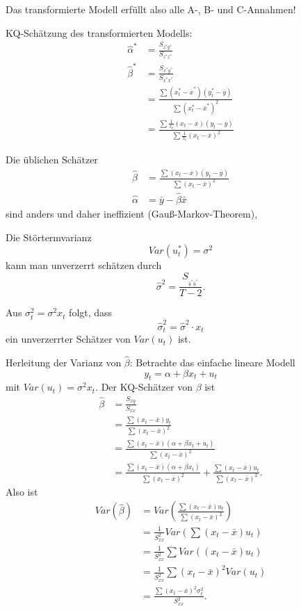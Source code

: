 \documentclass{article}
\begin{document}
Das transformierte Modell erfüllt also alle A-, B- und C-Annahmen!

KQ-Schätzung des transformierten Modells:
\begin{align*}
\hat\alpha^{\ast} &= \frac{S_{z^{\ast }y^{\ast }}}{S_{z^{\ast}z^{\ast }}} \\
\hat\beta^{\ast } &= \frac{S_{x^{\ast }y^{\ast }}}{S_{x^{\ast}x^{\ast }}} \\
&= \frac{\sum \left(x_t^{\ast }-\overline{x}^{\ast }\right) 
	\left(y_t^{\ast }-\overline{y}\right)}{\sum \left(x_t^{\ast }-\overline{x}^{\ast }\right)^2} \\
&= \frac{\sum \frac{1}{x_{t}}\left( x_{t}-\overline{x}\right) \left( y_{t}-\overline{y}\right) }
{\sum \frac{1}{x_{t}}\left( x_{t}-\overline{x}\right)^{2}}
\end{align*}

Die üblichen Schätzer
\begin{align*}
\hat{\beta} &=\frac{\sum \left( x_{t}-\overline{x}\right) 
	\left( y_{t}-\overline{y}\right) }{\sum \left( x_{t}-\overline{x}\right) ^{2}} \\
\hat{\alpha} &=\bar{y}-\hat{\beta}\bar{x}
\end{align*}
sind anders und daher ineffizient (Gauß-Markov-Theorem),

Die Störtermvarianz 
\[ Var(u_t^*)=\sigma^2 \]
kann man unverzerrt schätzen durch
\[ \hat{\sigma}^2=\frac{S_{_{\hat{u}^{\ast }\hat{u}^{\ast }}}}{T-2}. \] 

Aus $\sigma_t^2=\sigma^2 x_t$ folgt, dass 
\[ \hat{\sigma}_{t}^{2}=\hat{\sigma}^{2}\cdot x_{t} \]
ein unverzerrter Schätzer von $Var(u_{t})$ ist.

Herleitung der Varianz von $\hat\beta$: Betrachte das einfache lineare Modell
\[ y_{t}=\alpha +\beta x_{t}+u_{t} \]
mit $Var(u_{t})=\sigma ^{2}x_t$. Der KQ-Schätzer von $\beta $ ist
\begin{align*}
\hat\beta &=\frac{S_{xy}}{S_{xx}} \\
&=\frac{\sum \left( x_{t}-\bar{x}\right) y_{t}}{\sum \left( x_{t}-\bar{x}\right) ^{2}} \\
&=\frac{\sum \left( x_{t}-\bar{x}\right) \left( \alpha +\beta x_{t}+u_{t}\right)}
{\sum \left( x_{t}-\bar{x}\right) ^{2}} \\
&=\frac{\sum \left( x_{t}-\bar{x}\right) \left( \alpha +\beta x_{t}\right) 
}{\sum \left( x_{t}-\bar{x}\right)^2}+\frac{\sum \left( x_{t}-\bar{x}\right) u_{t}}
{\sum \left( x_{t}-\bar{x}\right)^2}.
\end{align*}
Also ist
\begin{align*}
Var(\hat\beta) &=Var\left( \frac{\sum \left( x_{t}-\bar{x}\right) u_{t}}
{\sum \left( x_{t}-\bar{x}\right) ^{2}}\right) \\
&=\frac{1}{S_{xx}^{2}}Var\left( \sum \left( x_{t}-\bar{x}\right)u_{t}\right) \\
&=\frac{1}{S_{xx}^{2}}\sum Var\left( \left( x_{t}-\bar{x}\right)u_{t}\right) \\
&=\frac{1}{S_{xx}^{2}}\sum \left( x_{t}-\bar{x}\right) ^{2}Var\left(u_{t}\right) \\
&=\frac{\sum \left( x_{t}-\bar{x}\right) ^{2}\sigma _{t}^{2}}{S_{xx}^{2}}.
\end{align*}
\end{document}
